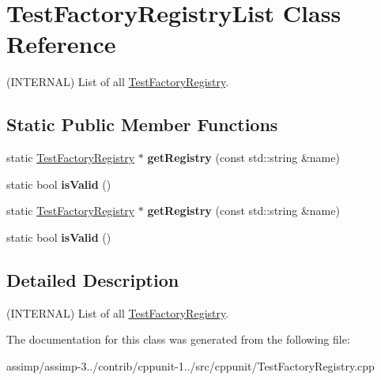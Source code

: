 \hypertarget{class_test_factory_registry_list}{\section{Test\+Factory\+Registry\+List Class Reference}
\label{class_test_factory_registry_list}
}


(I\+N\+T\+E\+R\+N\+A\+L) List of all \hyperlink{class_test_factory_registry}{Test\+Factory\+Registry}.  


\subsection*{Static Public Member Functions}
\begin{DoxyCompactItemize}
\item 
\hypertarget{class_test_factory_registry_list_ae090b35d49cf1a37421e173f659f2cee}{static \hyperlink{class_test_factory_registry}{Test\+Factory\+Registry} $\ast$ {\bfseries get\+Registry} (const std\+::string \&name)}\label{class_test_factory_registry_list_ae090b35d49cf1a37421e173f659f2cee}

\item 
\hypertarget{class_test_factory_registry_list_a9a799f9f2d2e7da406f6f576d46976cf}{static bool {\bfseries is\+Valid} ()}\label{class_test_factory_registry_list_a9a799f9f2d2e7da406f6f576d46976cf}

\item 
\hypertarget{class_test_factory_registry_list_ae090b35d49cf1a37421e173f659f2cee}{static \hyperlink{class_test_factory_registry}{Test\+Factory\+Registry} $\ast$ {\bfseries get\+Registry} (const std\+::string \&name)}\label{class_test_factory_registry_list_ae090b35d49cf1a37421e173f659f2cee}

\item 
\hypertarget{class_test_factory_registry_list_a9a799f9f2d2e7da406f6f576d46976cf}{static bool {\bfseries is\+Valid} ()}\label{class_test_factory_registry_list_a9a799f9f2d2e7da406f6f576d46976cf}

\end{DoxyCompactItemize}


\subsection{Detailed Description}
(I\+N\+T\+E\+R\+N\+A\+L) List of all \hyperlink{class_test_factory_registry}{Test\+Factory\+Registry}. 

The documentation for this class was generated from the following file\+:\begin{DoxyCompactItemize}
\item 
assimp/assimp-\/3../contrib/cppunit-\/1../src/cppunit/Test\+Factory\+Registry.\+cpp\end{DoxyCompactItemize}
